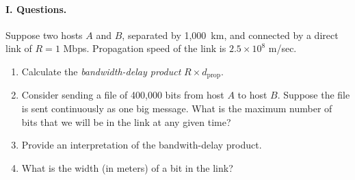 
\paragraph{I. Questions.}

Suppose two hosts \(A\) and \(B\), separated by 1,000~km, and
connected by a direct link of \(R = 1\) Mbps. Propagation speed of the
link is \(2.5 \times 10^8\) m/sec.
\begin{enumerate}

  \item Calculate the \emph{bandwidth-delay product} \(R \times
    d_{\text{prop}}\).

  \item Consider sending a file of 400,000 bits from host \(A\) to
    host \(B\). Suppose the file is sent continuously as one big
    message. What is the maximum number of bits that we will be in the
    link at any given time?

  \item Provide an interpretation of the bandwith-delay product.

  \item What is the width (in meters) of a bit in the link?

\end{enumerate}
